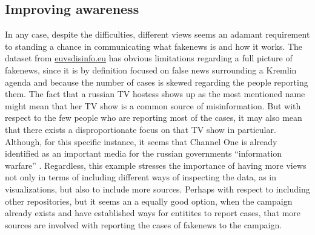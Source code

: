 \documentclass{article}
\begin{document}
\subsection{Improving awareness}
In any case, despite the difficulties, different views seems an adamant requirement to standing a chance in communicating what fakenews is and how it works. The dataset from \href{https://euvsdisinfo}{euvsdisinfo.eu} has obvious limitations regarding a full picture of fakenews, since it is by definition focused on false news surrounding a Kremlin agenda and because the number of cases is skewed regarding the people reporting them. The fact that a russian TV hostess shows up as the most mentioned name might mean that her TV show is a common source of misinformation. But with respect to the few people who are reporting most of the cases, it may also mean that there exists a disproportionate focus on that TV show in particular. Although, for this specific instance, it seems that Channel One is already identified as an important media for the russian governments ``information warfare'' \cite{the_narrative_battle}. Regardless, this example stresses the importance of having more views not only in terms of including different ways of inspecting the data, as in visualizations, but also to include more sources. Perhaps with respect to including other repositories, but it seems an a equally good option, when the campaign already exists and have established ways for entitites to report cases, that more sources are involved with reporting the cases of fakenews to the campaign.
\end{document}
